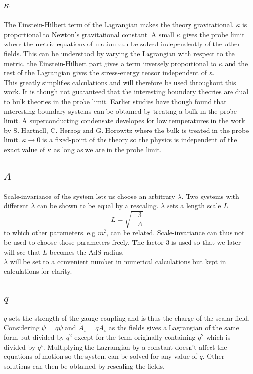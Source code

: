 \documentclass[12pt]{report}
\begin{document}
\subsection{$\kappa$}
The Einstein-Hilbert term of the Lagrangian makes the theory gravitational. $\kappa$ is proportional to Newton's gravitational constant. A small $\kappa$ gives the probe limit where the metric equations of motion can be solved independently of the other fields. This can be understood by varying the Lagrangian with respect to the metric, the Einstein-Hilbert part gives a term inversely proportional to $\kappa$ and the rest of the Lagrangian gives the stress-energy tensor independent of $\kappa$.\\

This greatly simplifies calculations and will therefore be used throughout this work. It is though not guaranteed that the interesting boundary theories are dual to bulk theories in the probe limit. Earlier studies have though found that interesting boundary systems can be obtained by treating a bulk in the probe limit. A superconducting condensate developes for low temperatures in the work by S. Hartnoll, C. Herzog and G. Horowitz \cite{hartnoll9} where the bulk is treated in the probe limit. $\kappa\rightarrow0$ is a fixed-point of the theory so the physics is independent of the exact value of $\kappa$ as long as we are in the probe limit.
\subsection{$\Lambda$}
Scale-invariance of the system lets us choose an arbitrary $\lambda$. Two systems with different $\lambda$ can be shown to be equal by a rescaling. $\lambda$ sets a length scale $L$
\begin{equation}
L=\sqrt{-\frac{3}{\Lambda}}
\end{equation}
to which other parameters, e.g $m^2$, can be related. Scale-invariance can thus not be used to choose those parameters freely. The factor 3 is used so that we later will see that $L$ becomes the AdS radius.\\
$\lambda$ will be set to a convenient number in numerical calculations but kept in calculations for clarity.
\subsection{$q$}
$q$ sets the strength of the gauge coupling and is thus the charge of the scalar field. Considering $\tilde{\psi}=q\psi$ and $\tilde{A}_a=qA_a$ as the fields gives a Lagrangian of the same form but divided by $q^2$ except for the term originally containing $q^2$ which is divided by $q^4$. Multiplying the Lagrangian by a constant doesn't affect the equations of motion so the system can be solved for any value of $q$. Other solutions can then be obtained by rescaling the fields.\\
\end{document}
